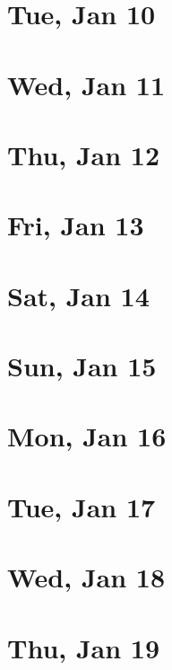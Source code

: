 	\section{Tue, Jan 10}
		
	\section{Wed, Jan 11}
		
	\section{Thu, Jan 12}
		
	\section{Fri, Jan 13}
		
	\section{Sat, Jan 14}
		
	\section{Sun, Jan 15}
		
	\section{Mon, Jan 16}
		
	\section{Tue, Jan 17}
		
	\section{Wed, Jan 18}
		
	\section{Thu, Jan 19}
		
